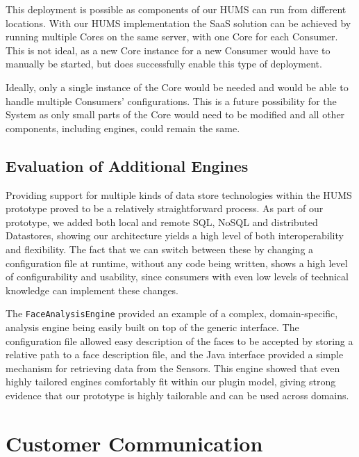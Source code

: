 \documentclass[10pt,a4paper]{article}
\begin{document}
This deployment is possible as components of our HUMS can run from different locations. With our HUMS implementation the SaaS solution can be achieved by running multiple Cores on the same server, with one Core for each Consumer. This is not ideal, as a new Core instance for a new Consumer would have to manually be started, but does successfully enable this type of deployment.

Ideally, only a single instance of the Core would be needed and would be able to handle multiple Consumers' configurations. This is a future possibility for the System as only small parts of the Core would need to be modified and all other components, including engines, could remain the same.

\subsection{Evaluation of Additional Engines}
\label{sec:additional}

Providing support for multiple kinds of data store technologies within the HUMS prototype proved to be a relatively straightforward process. As part of our prototype, we added both local and remote SQL, NoSQL and distributed Datastores, showing our architecture yields a high level of both interoperability and flexibility. The fact that we can switch between these by changing a configuration file at runtime, without any code being written, shows a high level of configurability and usability, since consumers with even low levels of technical knowledge can implement these changes.

The \texttt{FaceAnalysisEngine} provided an example of a complex, domain-specific, analysis engine being easily built on top of the generic interface. The configuration file allowed easy description of the faces to be accepted by storing a relative path to a face description file, and the Java interface provided a simple mechanism for retrieving data from the Sensors. This engine showed that even highly tailored engines comfortably fit within our plugin model, giving strong evidence that our prototype is highly tailorable and can be used across domains.


\section{Customer Communication}
\label{sec:customer_comms}
\end{document}
